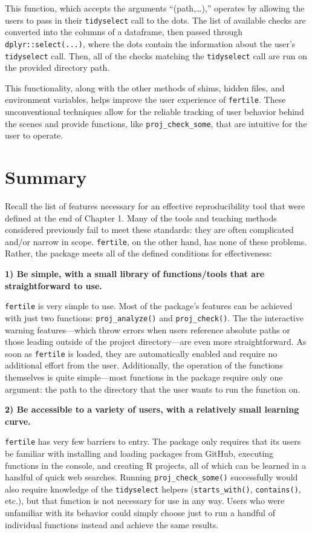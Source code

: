 \documentclass[12pt,twoside]{reedthesis}
\begin{document}
This function, which accepts the arguments ``(path,\ldots{}),'' operates
by allowing the users to pass in their \texttt{tidyselect} call to the
dots. The list of available checks are converted into the columns of a
dataframe, then passed through \texttt{dplyr::select(...)}, where the
dots contain the information about the user's \texttt{tidyselect} call.
Then, all of the checks matching the \texttt{tidyselect} call are run on
the provided directory path.

This functionality, along with the other methods of shims, hidden files,
and environment variables, helps improve the user experience of
\texttt{fertile}. These unconventional techniques allow for the reliable
tracking of user behavior behind the scenes and provide functions, like
\texttt{proj\_check\_some}, that are intuitive for the user to operate.

\section{Summary}\label{summary}

Recall the list of features necessary for an effective reproducibility
tool that were defined at the end of Chapter 1. Many of the tools and
teaching methods considered previously fail to meet these standards:
they are often complicated and/or narrow in scope. \texttt{fertile}, on
the other hand, has none of these problems. Rather, the package meets
all of the defined conditions for effectiveness:

\textbf{1) Be simple, with a small library of functions/tools that are
straightforward to use.}

\texttt{fertile} is very simple to use. Most of the package's features
can be achieved with just two functions: \texttt{proj\_analyze()} and
\texttt{proj\_check()}. The the interactive warning features---which
throw errors when users reference absolute paths or those leading
outside of the project directory---are even more straightforward. As
soon as \texttt{fertile} is loaded, they are automatically enabled and
require no additional effort from the user. Additionally, the operation
of the functions themselves is quite simple---most functions in the
package require only one argument: the path to the directory that the
user wants to run the function on.

\textbf{2) Be accessible to a variety of users, with a relatively small
learning curve.}

\texttt{fertile} has very few barriers to entry. The package only
requires that its users be familiar with installing and loading packages
from GitHub, executing functions in the console, and creating R
projects, all of which can be learned in a handful of quick web
searches. Running \texttt{proj\_check\_some()} successfully would also
require knowledge of the \texttt{tidyselect} helpers
(\texttt{starts\_with()}, \texttt{contains()}, etc.), but that function
is not necessary for use in any way. Users who were unfamiliar with its
behavior could simply choose just to run a handful of individual
functions instead and achieve the same results.
\end{document}
